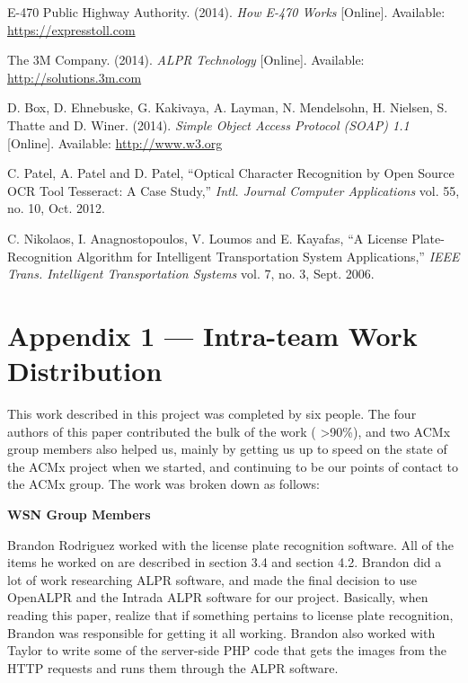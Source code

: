 \documentclass[11pt, oneside, fullpage, doublespace]{article}
\begin{document}
\begin{thebibliography}{99}
 E-470 Public Highway Authority. (2014). \emph{How E-470 Works} [Online]. Available: \url{https://expresstoll.com}

 The 3M Company. (2014). \emph{ALPR Technology} [Online]. Available: \url{http://solutions.3m.com}

 D. Box, D. Ehnebuske, G. Kakivaya, A. Layman, N. Mendelsohn, H. Nielsen, S. Thatte and D. Winer. (2014). \emph{Simple Object Access Protocol (SOAP) 1.1} [Online]. Available: \url{http://www.w3.org}

 C. Patel, A. Patel and D. Patel, ``Optical Character Recognition by Open Source OCR Tool Tesseract: A Case Study,'' \emph{Intl. Journal Computer Applications} vol. 55, no. 10, Oct. 2012.

 C. Nikolaos, I. Anagnostopoulos, V. Loumos and E. Kayafas, ``A License Plate-Recognition Algorithm for Intelligent Transportation System Applications,'' \emph{IEEE Trans. Intelligent Transportation Systems} vol. 7, no. 3, Sept. 2006.

\end{thebibliography}


\section*{Appendix 1 --- Intra-team Work Distribution}

This work described in this project was completed by six people. The four authors of this paper contributed the bulk of the work ( >90\%), and two ACMx group members also helped us, mainly by getting us up to speed on the state of the ACMx project when we started, and continuing to be our points of contact to the ACMx group. The work was broken down as follows:

\textbf{WSN Group Members}

Brandon Rodriguez worked with the license plate recognition software. All of the items he worked on are described in section 3.4 and section 4.2. Brandon did a lot of work researching ALPR software, and made the final decision to use OpenALPR and the Intrada ALPR software for our project. Basically, when reading this paper, realize that if something pertains to license plate recognition, Brandon was responsible for getting it all working. Brandon also worked with Taylor to write some of the server-side PHP code that gets the images from the HTTP requests and runs them through the ALPR software.
\end{document}
